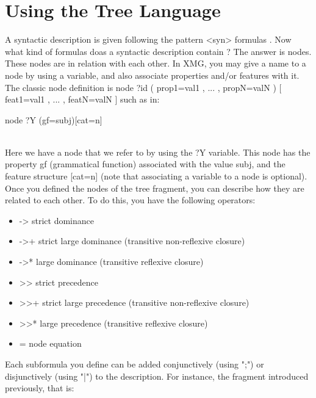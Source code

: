 \documentclass[11pt,fleqn]{book} %
\begin{document}
\chapter{Using the Tree Language}
A syntactic description is given following the pattern <syn>{ formulas }. Now what kind of formulas doas a syntactic description contain ? The answer is nodes. These nodes are in relation with each other. In XMG, you may give a name to a node by using a variable, and also associate properties and/or features with it. The classic node definition is node ?id ( prop1=val1 , ... , propN=valN ) [ feat1=val1 , ... , featN=valN ] such as in:
\\
\begin{theorem}
node ?Y (gf=subj)[cat=n]
\end{theorem}
\\
Here we have a node that we refer to by using the ?Y variable. This node has the property gf (grammatical function) associated with the value subj, and the feature structure [cat=n] (note that associating a variable to a node is optional).
\\
Once you defined the nodes of the tree fragment, you can describe how they are related to each other. To do this, you have the following operators:

\begin{itemize}
\item -> 	strict dominance
\item ->+ 	strict large dominance (transitive non-reflexive closure)
\item ->* 	large dominance (transitive reflexive closure)
\item >> 	strict precedence
\item >>+ 	strict large precedence (transitive non-reflexive closure)
\item >>* 	large precedence (transitive reflexive closure)
\item = 	node equation
\end{itemize}
Each subformula you define can be added conjunctively (using ";") or disjunctively (using "|") to the description. For instance, the fragment introduced previously, that is:
\end{document}
